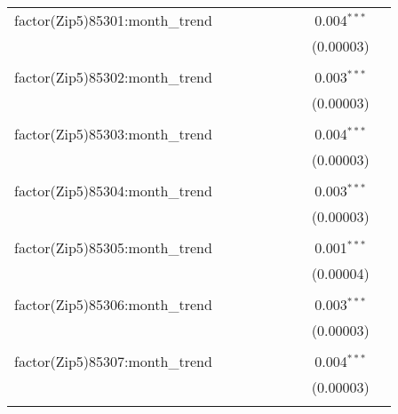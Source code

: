 \begin{table}[H]
{\begin{tabular}{@{\extracolsep{5pt}}lcccccccc}
  factor(Zip5)85301:month\_trend &  &  &  &  &  &  & 0.004$^{***}$ &  \\  

   &  &  &  &  &  &  & (0.00003) &  \\  

   & & & & & & & & \\  

  factor(Zip5)85302:month\_trend &  &  &  &  &  &  & 0.003$^{***}$ &  \\  

   &  &  &  &  &  &  & (0.00003) &  \\  

   & & & & & & & & \\  

  factor(Zip5)85303:month\_trend &  &  &  &  &  &  & 0.004$^{***}$ &  \\  

   &  &  &  &  &  &  & (0.00003) &  \\  

   & & & & & & & & \\  

  factor(Zip5)85304:month\_trend &  &  &  &  &  &  & 0.003$^{***}$ &  \\  

   &  &  &  &  &  &  & (0.00003) &  \\  

   & & & & & & & & \\  

  factor(Zip5)85305:month\_trend &  &  &  &  &  &  & 0.001$^{***}$ &  \\  

   &  &  &  &  &  &  & (0.00004) &  \\  

   & & & & & & & & \\  

  factor(Zip5)85306:month\_trend &  &  &  &  &  &  & 0.003$^{***}$ &  \\  

   &  &  &  &  &  &  & (0.00003) &  \\  

   & & & & & & & & \\  

  factor(Zip5)85307:month\_trend &  &  &  &  &  &  & 0.004$^{***}$ &  \\  

   &  &  &  &  &  &  & (0.00003) &  \\  

   & & & & & & & & \\  


\end{tabular}}
\end{table}
